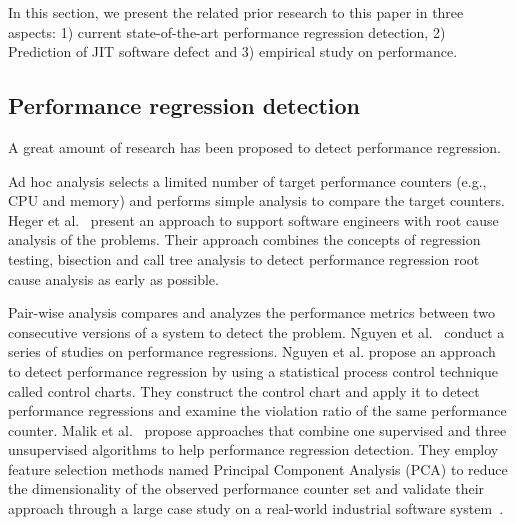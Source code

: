 In this section, we present the related prior research to this paper in three aspects: 1) current state-of-the-art performance regression detection, 2) Prediction of JIT software defect and 3) empirical study on performance.

\subsection{Performance regression detection}
A great amount of research has been proposed to detect performance regression.

Ad hoc analysis selects a limited number of target performance counters (e.g., CPU and memory) and performs simple analysis to compare the target counters. Heger et al.~\cite{Heger:2013:ARC} present an approach to support software engineers with root cause analysis of the problems. Their approach combines the concepts of regression testing, bisection and call tree analysis to detect performance regression root cause analysis as early as possible.

Pair-wise analysis compares and analyzes the performance metrics between two consecutive versions of a system to detect the problem. Nguyen et al.~\cite{Nguyen:2012:ADP,nguyen2011automated,Nguyen:2014:ICS} conduct a series of studies on performance regressions. Nguyen et al. propose an approach to detect performance regression by using a statistical process control technique called control charts. They construct the control chart and apply it to detect performance regressions and examine the violation ratio of the same performance counter. Malik et al.~\cite{Malik:2013:ADP} propose approaches that combine one supervised and three unsupervised algorithms to help performance regression detection. They employ feature selection methods named Principal Component Analysis (PCA) to reduce the dimensionality of the observed performance counter set and validate their approach through a large case study on a real-world industrial software system~\cite{malik2010automatic}.

